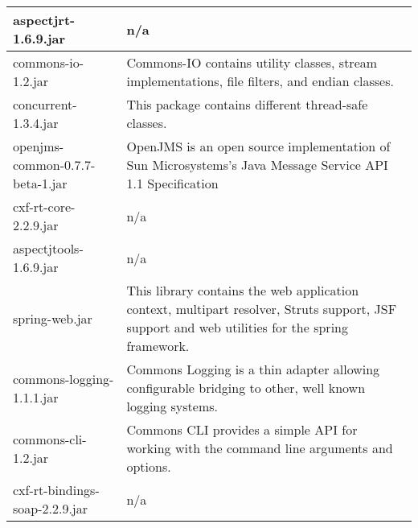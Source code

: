 \begin{center}
\begin{longtable}{|p{}|p{}|}
\hline 
aspectjrt-1.6.9.jar & n/a\\
\hline 
commons-io-1.2.jar & Commons-IO contains utility classes, stream implementations, file filters, and endian classes.\\
\hline 
concurrent-1.3.4.jar & This package contains different thread-safe classes.\\
\hline 
openjms-common-0.7.7-beta-1.jar & OpenJMS is an open source implementation of Sun Microsystems's Java Message Service API 1.1 Specification\\
\hline 
cxf-rt-core-2.2.9.jar & n/a\\
\hline 
aspectjtools-1.6.9.jar & n/a\\
\hline 
spring-web.jar & This library contains the web application context, multipart resolver, Struts support, JSF support and web utilities for the spring framework.\\
\hline 
commons-logging-1.1.1.jar & Commons Logging is a thin adapter allowing configurable bridging to other, well known logging systems.\\
\hline 
commons-cli-1.2.jar & Commons CLI provides a simple API for working with the command line arguments and options.\\
\hline 
cxf-rt-bindings-soap-2.2.9.jar & n/a\\
\hline 
\end{longtable}
\label{tabular:libraries}
\end{center}
